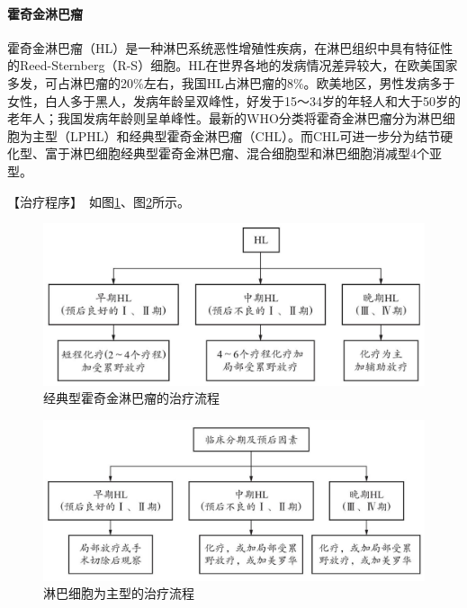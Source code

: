 \paragraph{霍奇金淋巴瘤}

霍奇金淋巴瘤（HL）是一种淋巴系统恶性增殖性疾病，在淋巴组织中具有特征性的Reed-Sternberg（R-S）细胞。HL在世界各地的发病情况差异较大，在欧美国家多发，可占淋巴瘤的20\%左右，我国HL占淋巴瘤的8\%。欧美地区，男性发病多于女性，白人多于黑人，发病年龄呈双峰性，好发于15～34岁的年轻人和大于50岁的老年人；我国发病年龄则呈单峰性。最新的WHO分类将霍奇金淋巴瘤分为淋巴细胞为主型（LPHL）和经典型霍奇金淋巴瘤（CHL）。而CHL可进一步分为结节硬化型、富于淋巴细胞经典型霍奇金淋巴瘤、混合细胞型和淋巴细胞消减型4个亚型。

【治疗程序】　如图\ref{fig5-4-1}、图\ref{fig5-4-2}所示。

\begin{figure}[!htbp]
 \centering
 \includegraphics{./images/Image00153.jpg}
 \captionsetup{justification=centering}
 \caption{经典型霍奇金淋巴瘤的治疗流程}
 \label{fig5-4-1}
  \end{figure} 

\begin{figure}[!htbp]
 \centering
 \includegraphics{./images/Image00154.jpg}
 \captionsetup{justification=centering}
 \caption{淋巴细胞为主型的治疗流程}
 \label{fig5-4-2}
  \end{figure} 

